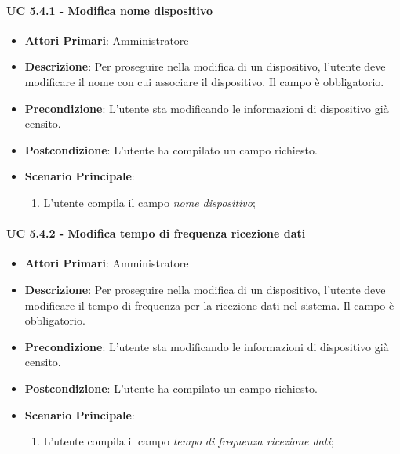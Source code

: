 			
				\paragraph{UC 5.4.1 - Modifica nome dispositivo}
				\begin{itemize}
					\item \textbf{Attori Primari}: Amministratore
					\item \textbf{Descrizione}: Per proseguire nella modifica di un dispositivo, l'utente deve modificare il nome con cui associare il dispositivo. Il campo è obbligatorio.
					\item \textbf{Precondizione}: L'utente sta modificando le informazioni di dispositivo già censito.
					\item \textbf{Postcondizione}: L'utente ha compilato un campo richiesto.
					\item \textbf{Scenario Principale}:
					\begin{enumerate}
						\item{L'utente compila il campo \textit{nome dispositivo};}
					\end{enumerate}
				\end{itemize}

				\paragraph{UC 5.4.2 - Modifica tempo di frequenza ricezione dati}
				\begin{itemize}
					\item \textbf{Attori Primari}: Amministratore
					\item \textbf{Descrizione}: Per proseguire nella modifica di un dispositivo, l'utente deve modificare il tempo di frequenza per la ricezione dati nel sistema. Il campo è obbligatorio.
					\item \textbf{Precondizione}: L'utente sta modificando le informazioni di dispositivo già censito.
					\item \textbf{Postcondizione}: L'utente ha compilato un campo richiesto.
					\item \textbf{Scenario Principale}:
					\begin{enumerate}
						\item{L'utente compila il campo \textit{tempo di frequenza ricezione dati};}
					\end{enumerate}
				\end{itemize}


